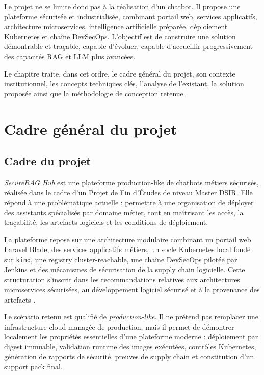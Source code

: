 Le projet ne se limite donc pas à la réalisation d’un chatbot. Il propose une plateforme sécurisée et industrialisée, combinant portail web, services applicatifs, architecture microservices, intelligence artificielle préparée, déploiement Kubernetes et chaîne DevSecOps. L’objectif est de construire une solution démontrable et traçable, capable d'évoluer, capable d’accueillir progressivement des capacités RAG et LLM plus avancées.

Le chapitre traite, dans cet ordre, le cadre général du projet, son contexte institutionnel, les concepts techniques clés, l’analyse de l’existant, la solution proposée ainsi que la méthodologie de conception retenue.
\section{Cadre général du projet}

\subsection{Cadre du projet}

\textit{SecureRAG Hub} est une plateforme production-like de chatbots métiers sécurisés, réalisée dans le cadre d’un Projet de Fin d’Études de niveau Master DSIR. Elle répond à une problématique actuelle : permettre à une organisation de déployer des assistants spécialisés par domaine métier, tout en maîtrisant les accès, la traçabilité, les artefacts logiciels et les conditions de déploiement.

La plateforme repose sur une architecture modulaire combinant un portail web Laravel Blade, des services applicatifs métiers, un socle Kubernetes local fondé sur \texttt{kind}, une registry cluster-reachable, une chaîne DevSecOps pilotée par Jenkins et des mécanismes de sécurisation de la supply chain logicielle. Cette structuration s’inscrit dans les recommandations relatives aux architectures microservices sécurisées, au développement logiciel sécurisé et à la provenance des artefacts \cite{nist_sp_800_204,nist_ssdf_800_218,slsa_spec_v1,sigstore_ccs_2022}.

Le scénario retenu est qualifié de \textit{production-like}. Il ne prétend pas remplacer une infrastructure cloud managée de production, mais il permet de démontrer localement les propriétés essentielles d’une plateforme moderne : déploiement par digest immuable, validation runtime des images exécutées, contrôles Kubernetes, génération de rapports de sécurité, preuves de supply chain et constitution d’un support pack final.

